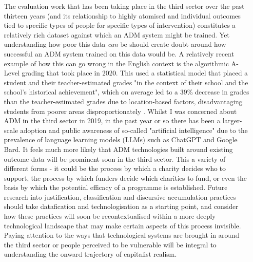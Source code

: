 The evaluation work that has been taking place in the third sector over the past thirteen years (and its relationship to highly atomised and individual outcomes tied to specific types of people for specific types of intervention) constitutes a relatively rich dataset against which an ADM system might be trained. Yet understanding how poor this data \textit{can} be should create doubt around how successful an ADM system trained on this data would be. A relatively recent example of how this can go wrong in the English context is the algorithmic A-Level grading that took place in 2020. This used a statistical model that placed a student and their teacher-estimated grades "in the context of their school and the school’s historical achievement", which on average led to a 39\% decrease in grades than the teacher-estimated grades due to location-based factors, disadvantaging students from poorer areas disproportionately \citep[p. 608]{mead_contested_2023}. Whilst I was concerned about ADM in the third sector in 2019, in the past year or so there has been a larger-scale adoption and public awareness of so-called "artificial intelligence" due to the prevalence of language learning models (LLMs) such as ChatGPT and Google Bard. It feels much more likely that ADM technologies built around existing outcome data will be prominent soon in the third sector. This a variety of different forms - it could be the process by which a charity decides who to support, the process by which funders decide which charities to fund, or even the basis by which the potential efficacy of a programme is established. Future research into justification, classification and discursive accumulation practices should take datafication and technologisation as a starting point, and consider how these practices will soon be recontextualised within a more deeply technological landscape that may make certain aspects of this process invisible. Paying attention to the ways that technological systems are brought in around the third sector or people perceived to be vulnerable will be integral to understanding the onward trajectory of capitalist realism.

